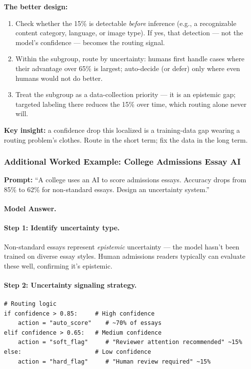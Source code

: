 \textbf{The better design:}
\begin{enumerate}
    \item Check whether the 15\% is detectable \emph{before} inference (e.g., a recognizable content category, language, or image type). If yes, that detection --- not the model's confidence --- becomes the routing signal.
    \item Within the subgroup, route by uncertainty: humans first handle cases where their advantage over 65\% is largest; auto-decide (or defer) only where even humans would not do better.
    \item Treat the subgroup as a data-collection priority --- it is an epistemic gap; targeted labeling there reduces the 15\% over time, which routing alone never will.
\end{enumerate}

\textbf{Key insight:} a confidence drop this localized is a training-data gap wearing a routing problem's clothes. Route in the short term; fix the data in the long term.

\subsubsection{Additional Worked Example: College Admissions Essay AI}

\textbf{Prompt:} ``A college uses an AI to score admissions essays. Accuracy drops from 85\% to 62\% for non-standard essays. Design an uncertainty system.''

\paragraph{Model Answer.}

\paragraph{Step 1: Identify uncertainty type.}
Non-standard essays represent \emph{epistemic} uncertainty --- the model hasn't been trained on diverse essay styles. Human admissions readers typically can evaluate these well, confirming it's epistemic.

\paragraph{Step 2: Uncertainty signaling strategy.}
\begin{lstlisting}[style=python, caption={Confidence routing logic for admissions AI}]
# Routing logic
if confidence > 0.85:     # High confidence
    action = "auto_score"    # ~70% of essays
elif confidence > 0.65:   # Medium confidence
    action = "soft_flag"     # "Reviewer attention recommended" ~15%
else:                     # Low confidence
    action = "hard_flag"     # "Human review required" ~15%
\end{lstlisting}

